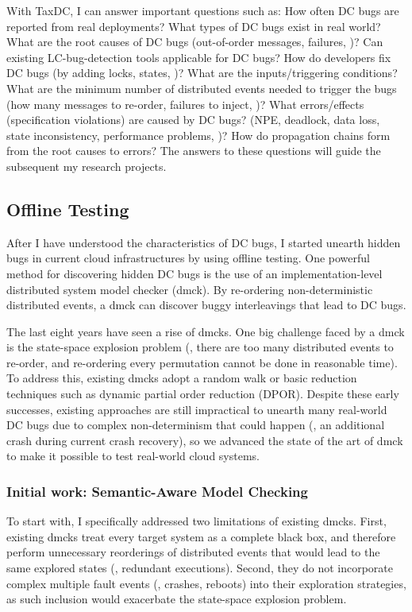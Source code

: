 \documentclass[11pt]{article}
\begin{document}
With TaxDC, I can answer important questions such as: How often DC bugs are
reported from real deployments? What types of DC bugs exist in real world?  What
are the root causes of DC bugs (out-of-order messages, failures, \etc)? Can
existing LC-bug-detection tools applicable for DC bugs? How do developers fix DC
bugs (by adding locks, states, \etc)? What are the inputs/triggering conditions?
What are the minimum number of distributed events needed to trigger the bugs
(how many messages to re-order, failures to inject, \etc)? What errors/effects
(specification violations) are caused by DC bugs? (NPE, deadlock, data loss,
state inconsistency, performance problems, \etc)? How do propagation chains form
from the root causes to errors? The answers to these questions will guide the
subsequent my research projects.

\subsection{Offline Testing}

After I have understood the characteristics of DC bugs, I started unearth hidden
bugs in current cloud infrastructures by using offline testing. One powerful
method for discovering hidden DC bugs is the use of an implementation-level
distributed system model checker (dmck). By re-ordering non-deterministic
distributed events, a dmck can discover buggy interleavings that lead to DC
bugs.

The last eight years have seen a rise of dmcks. One big challenge faced by a
dmck is the state-space explosion problem (\ie, there are too many distributed
events to re-order, and re-ordering every permutation cannot be done in
reasonable time). To address this, existing dmcks adopt a random walk or basic
reduction techniques such as dynamic partial order reduction (DPOR). Despite
these early successes, existing approaches are still impractical to unearth many
real-world DC bugs due to complex non-determinism that could happen (\eg, an
additional crash during current crash recovery), so we advanced the state of the
art of dmck to make it possible to test real-world cloud systems.

\subsubsection*{Initial work: Semantic-Aware Model Checking} 

To start with, I specifically addressed two limitations of existing dmcks.
First, existing dmcks treat every target system as a complete black box, and
therefore perform unnecessary reorderings of distributed events that would lead
to the same explored states (\ie, redundant executions). Second, they do not
incorporate complex multiple fault events (\eg, crashes, reboots) into their
exploration strategies, as such inclusion would exacerbate the state-space
explosion problem.
\end{document}
